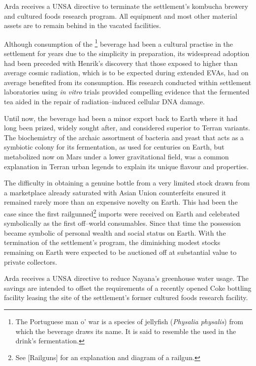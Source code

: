 Arda receives a UNSA directive to terminate the settlement's kombucha brewery and cultured foods research program. All equipment and most other material assets are to remain behind in the vacated facilities. 

Although consumption of the \footnote{The Portuguese man o' war is a species of jellyfish ({\it Physalia physalis}) from which the beverage draws its name. It is said to resemble the  used in the drink's fermentation.} beverage had been a cultural practise in the settlement for years due to the simplicity in preparation, its widespread adoption had been preceded with Henrik's discovery that those exposed to higher than average cosmic radiation, which is to be expected during extended EVAs, had on average benefited from its consumption. His research conducted within settlement laboratories using {\it in vitro} trials provided compelling evidence that the fermented tea aided in the repair of radiation--induced cellular DNA damage. 

Until now, the beverage had been a minor export back to Earth where it had long been prized, widely sought after, and considered superior to Terran variants. The biochemistry of the archaic assortment of bacteria and yeast that acts as a symbiotic colony for its fermentation, as used for centuries on Earth, but metabolized now on Mars under a lower gravitational field, was a common explanation in Terran urban legends to explain its unique flavour and properties.

The difficulty in obtaining a genuine bottle from a very limited stock drawn from a marketplace already saturated with Asian Union counterfeits ensured it remained rarely more than an expensive novelty on Earth. This had been the case since the first railgunned\footnote{See [Railguns] for an explanation and diagram of a railgun.} imports were received on Earth and celebrated symbolically as the first off--world consumables. Since that time the possession became symbolic of personal wealth and social status on Earth. With the termination of the settlement's program, the diminishing modest stocks remaining on Earth were expected to be auctioned off at substantial value to private collectors.
\StopTimelineDate

Arda receives a UNSA directive to reduce Nayana's greenhouse water usage. The savings are intended to offset the requirements of a recently opened Coke bottling facility leasing the site of the settlement's former cultured foods research facility.
\StopTimelineDate

